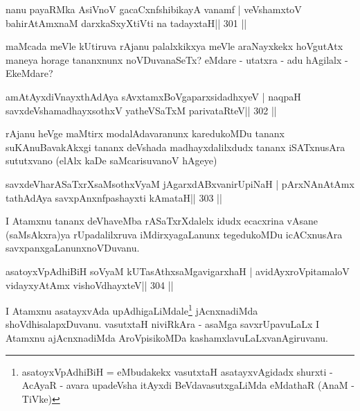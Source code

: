 \begin{shl}
nanu payaRMka AsiVnoV gacaCxnfshibikayA vanamf |
veVshamxtoV bahirAtAmxnaM darxkaSxyXtiVti na tadayxtaH\hfill || 301 ||
\end{shl}

\begin{artha}
maMcada meVle kUtiruva rAjanu palalxkikxya meVle araNayxkekx hoVgutAtx maneya horage tananxnunx noVDuvanaSeTx? eMdare - utatxra - adu hAgilalx - EkeMdare?
\end{artha}

\begin{shl}
amAtAyxdiVnayxthA\s\s dAya sAvxtamxBoVgaparxsidadhxyeV |
naqpaH savxdeVshamadhayxsothxV yatheVSaTxM parivataRteV\hfill || 302 ||
\end{shl}

\begin{artha}
rAjanu heVge maMtirx modalAdavaranunx karedukoMDu tananx suKAnuBavakAkxgi tananx deVshada madhayxdalilxdudx tananx iSATxnusAra sututxvano (elAlx kaDe saMcarisuvanoV hAgeye)
\end{artha}

\begin{shl}
savxdeVharASaTxrXsaMsothxV\s yaM jAgarxdABxvanirUpiNaH |
pArxNAnAtAmx tathA\s\s dAya savxpAnxnfpashayxti kAmataH\hfill || 303 ||
\end{shl}

\begin{artha}
I Atamxnu tananx deVhaveMba rASaTxrXdalelx idudx ecacxrina vAsane (saMsAkxra)ya rUpadalilxruva iMdirxyagaLanunx tegedukoMDu icACxnusAra savxpanxgaLanunx\break noVDuvanu.
\end{artha}


\begin{shl}
asatoyxVpAdhiBiH soV\s yaM kUTasAthxsaMgavigarxhaH |
avidAyxroVpitamaloV vidayxyA\s\s tAmx vishoVdhayxteV\hfill || 304 ||
\end{shl}

\begin{artha}
I Atamxnu asatayxvAda upAdhigaLiMdale\footnote{asatoyxVpAdhiBiH =  eMbudakekx vasutxtaH asatayxvAgidadx shurxti - AcAyaR - avara upadeVsha itAyxdi BeVdavasutxgaLiMda eMdathaR (AnaM - TiVke)} jAcnxnadiMda shoVdhisalapxDuvanu. vasutxtaH niviRkAra - asaMga savxrUpavuLaLx I Atamxnu ajAcnxnadiMda AroVpisikoMDa kashamxlavuLaLxvanAgiruvanu.
\end{artha}

